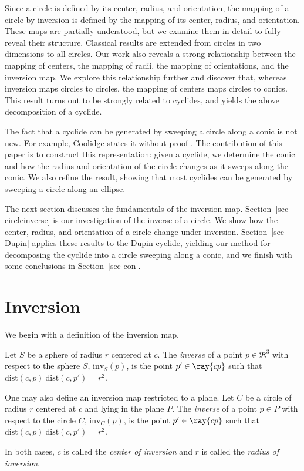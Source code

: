 Since a circle is defined by its center, radius, and orientation,
the mapping of a circle by inversion is defined by the mapping of its
center, radius, and orientation.
These maps are partially understood, but we examine them in detail to
fully reveal their structure.
Classical results are extended from circles in two dimensions to all circles.
Our work also reveals a strong relationship between the 
mapping of centers, the mapping of radii, the mapping of orientations,
and the inversion map.
We explore this relationship further and discover that, whereas inversion
maps circles to circles, the mapping of centers maps circles to conics.
This result turns out to be strongly related to cyclides, and yields
the above decomposition of a cyclide.

The fact that a cyclide can be generated by sweeping 
a circle along a conic is not new.
For example, Coolidge states it without proof \cite[p. 267]{Coo71}.
The contribution of this paper is to construct this representation:
given a cyclide, we determine the conic and how
the radius and orientation of the circle changes as it sweeps along
the conic.
We also refine the result, showing that most cyclides can be generated
by sweeping a circle along an ellipse.



The next section discusses the fundamentals of the inversion map.
Section~\ref{sec-circleinverse} is our investigation of the inverse of a 
circle.  We show how the center, radius, and orientation of a circle 
change under inversion.
Section~\ref{sec-Dupin} applies these results to the Dupin cyclide,
yielding our method for decomposing the cyclide into a circle
sweeping along a conic,
and we finish with some conclusions in Section~\ref{sec-con}.


\section{Inversion}
We begin with a definition of the inversion map.
%
\begin{definition}
Let $S$ be a sphere of radius $r$ centered at $c$.
The {\em inverse} of a point $p \in \Re^{3}$ with respect to the sphere $S$,
$\mbox{inv}_{S}(p)$, is the point $p' \in \ray{cp}$ such that
$\mbox{dist}(c,p)\ \mbox{dist}(c,p') = r^{2}$.

One may also define an inversion map restricted to a plane.
Let $C$ be a circle of radius $r$ centered at $c$ and lying in the plane $P$.
The {\em inverse} of a point $p \in P$ with respect to the circle $C$, 
$\mbox{inv}_{C}(p)$, is the point $p' \in \ray{cp}$ such that
$\mbox{dist}(c,p)\ \mbox{dist}(c,p') = r^{2}$.

In both cases, $c$ is called the {\em center of inversion}
and $r$ is called the {\em radius of inversion}.
\end{definition}

